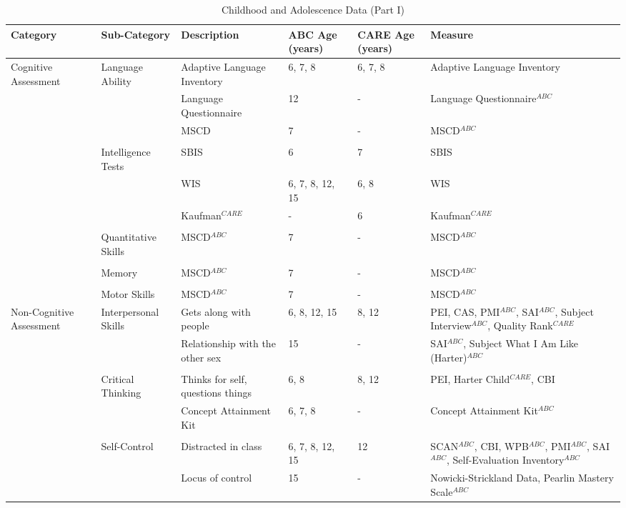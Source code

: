 \begin{sidewaystable}[H]
\begin{threeparttable}
\small
\caption{Childhood and Adolescence Data (Part I)} \label{tab:youthvars_1}
\centering
\tiny	
\begin{tabular}{L{3.5cm} C{3.5cm} C{5cm} C{1.5cm} C{1.5cm} C{6cm}}
\toprule
\textbf{Category}	&	\textbf{Sub-Category}	&	\textbf{Description}	&	\textbf{ABC Age (years)}  	&  \textbf{CARE Age (years)}  & 	\textbf{Measure}	\\ \midrule
Cognitive Assessment	&	Language Ability	&	Adaptive Language Inventory	&	6, 7, 8	&	6, 7, 8	&	Adaptive Language Inventory	\\
	&		&	Language Questionnaire	&	12	&	- 	&	Language Questionnaire$^{ABC}$	\\
	&		&	MSCD 	&	7	&	- 	&	MSCD$^{ABC}$	\\
	&	\\
	&	Intelligence Tests	&	SBIS	 &	6	&	7	&	SBIS	\\
	&		&	 WIS	&	6, 7, 8, 12, 15	&	6, 8	&	WIS	\\
	&		& Kaufman$^{CARE}$ & 	-	& 6 & Kaufman$^{CARE}$ \\
	&	\\
	&	Quantitative Skills	&	MSCD$^{ABC}$ 	&	7	&	-	&	MSCD$^{ABC}$ 	\\
	&	\\
	&	Memory	&	MSCD$^{ABC}$ 	&	7	&	-	&	MSCD$^{ABC}$	\\
	&	\\
	&	Motor Skills	&	MSCD$^{ABC}$ 	&	7	&	-	&	MSCD$^{ABC}$	\\ \midrule
Non-Cognitive Assessment	&	Interpersonal Skills	&	Gets along with people	&	6, 8, 12, 15	& 	8, 12	&	PEI, CAS, PMI$^{ABC}$, SAI$^{ABC}$, Subject Interview$^{ABC}$, Quality Rank$^{CARE}$	\\
	&		&	Relationship with the other sex	&	15	&	- 	&	 SAI$^{ABC}$, Subject What I Am Like (Harter)$^{ABC}$	\\
	&	\\
	&	Critical Thinking	&	Thinks for self, questions things	&	6, 8	 &	8, 12	&	PEI, Harter Child$^{CARE}$, CBI	\\
	&		&	Concept Attainment Kit	&	6, 7, 8	&	- 	&	Concept Attainment Kit$^{ABC}$	\\
	&	\\
	&	Self-Control	&	Distracted in class	&	6, 7, 8, 12, 15	&	12	&	SCAN$^{ABC}$, CBI, WPB$^{ABC}$, PMI$^{ABC}$, SAI$^{ABC}$, Self-Evaluation Inventory$^{ABC}$	\\
	&		&	Locus of control	&	15	&	- 	&	Nowicki-Strickland Data, Pearlin Mastery Scale$^{ABC}$	\\

\end{tabular}
\end{threeparttable}
\end{sidewaystable}
